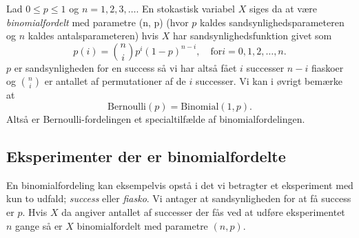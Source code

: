 \begin{definition}[Binomialfordelingen] \label{ads:forbin}
  Lad $0 \leq p \leq 1$ og $n = 1,2,3,\ldots$. En stokastisk variabel $X$ siges da at være \textit{binomialfordelt} med parametre (n, p) (hvor $p$ kaldes sandsynlighedsparameteren og $n$ kaldes antalsparameteren) hvis $X$ har sandsynlighedsfunktion givet som
  \[ 
  p(i) = \binom{n}{i}p^{i}(1-p)^{n-i}, \quad \text{for} i = 0,1,2,\ldots ,n
  .\]
  $p$ er sandsynligheden for en success så vi har altså fået $i$ successer $n-i$ fiaskoer og $\binom{n}{i}$ er antallet af permutationer af de $i$ successer. Vi kan i øvrigt bemærke at
  \[ 
    \mathrm{Bernoulli}(p) = \mathrm{Binomial}(1,p)
  .\]
  Altså er Bernoulli-fordelingen et specialtilfælde af binomialfordelingen.
\end{definition}

\subsection{Eksperimenter der er binomialfordelte}
En binomialfordeling kan eksempelvis opstå i det vi betragter et eksperiment med kun to udfald; \textit{success} eller \textit{fiasko}. Vi antager at sandsynligheden for at få success er $p$. Hvis $X$ da angiver antallet af successer der fås ved at udføre eksperimentet $n$ gange så er $X$ binomialfordelt med parametre $(n,p)$. 


